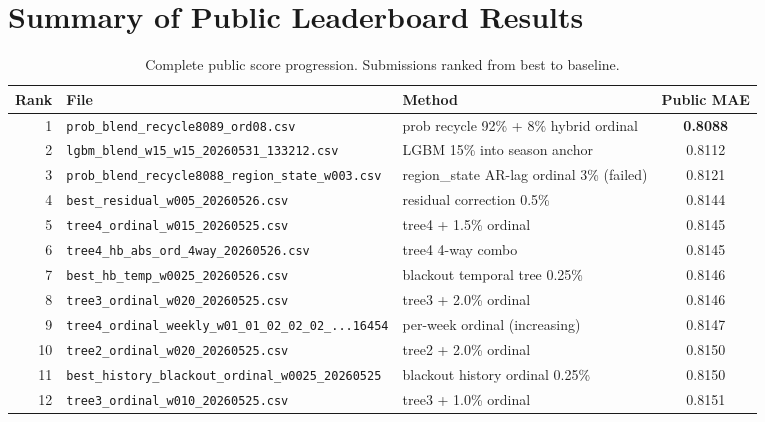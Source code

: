 \documentclass[12pt, a4paper]{article}
\begin{document}
\section{Summary of Public Leaderboard Results}

\begin{table}[H]
\centering
\caption{Complete public score progression. Submissions ranked from best to baseline.}
\label{tab:summary}
\begin{tabular}{@{}rllc@{}}
\toprule
\textbf{Rank} & \textbf{File} & \textbf{Method} & \textbf{Public MAE} \\
\midrule
 1 & \texttt{prob\_blend\_recycle8089\_ord08.csv}              & prob recycle 92\% + 8\% hybrid ordinal       & \textbf{0.8088} \\
 2 & \texttt{lgbm\_blend\_w15\_w15\_20260531\_133212.csv}       & LGBM 15\% into season anchor                 & 0.8112 \\
 3 & \texttt{prob\_blend\_recycle8088\_region\_state\_w003.csv}  & region\_state AR-lag ordinal 3\% (failed)   & 0.8121 \\
 4 & \texttt{best\_residual\_w005\_20260526.csv}              & residual correction 0.5\%                    & 0.8144 \\
 5 & \texttt{tree4\_ordinal\_w015\_20260525.csv}                & tree4 + 1.5\% ordinal                       & 0.8145 \\
 6 & \texttt{tree4\_hb\_abs\_ord\_4way\_20260526.csv}            & tree4 4-way combo                            & 0.8145 \\
 7 & \texttt{best\_hb\_temp\_w0025\_20260526.csv}               & blackout temporal tree 0.25\%               & 0.8146 \\
 8 & \texttt{tree3\_ordinal\_w020\_20260525.csv}                & tree3 + 2.0\% ordinal                       & 0.8146 \\
 9 & \texttt{tree4\_ordinal\_weekly\_w01\_01\_02\_02\_02\_...16454} & per-week ordinal (increasing)           & 0.8147 \\
10 & \texttt{tree2\_ordinal\_w020\_20260525.csv}                & tree2 + 2.0\% ordinal                       & 0.8150 \\
11 & \texttt{best\_history\_blackout\_ordinal\_w0025\_20260525}  & blackout history ordinal 0.25\%             & 0.8150 \\
12 & \texttt{tree3\_ordinal\_w010\_20260525.csv}                & tree3 + 1.0\% ordinal                       & 0.8151 \\

\end{tabular}
\end{table}
\end{document}
